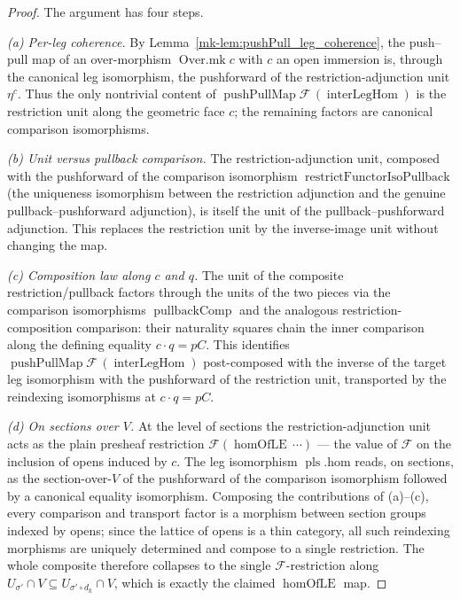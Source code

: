 \begin{proof}
  The argument has four steps.

  \emph{(a) Per-leg coherence.} By Lemma~\ref{mk-lem:pushPull_leg_coherence}, the push--pull map of an
  over-morphism \(\operatorname{Over.mk} c\) with \(c\) an open immersion is, through the canonical
  leg isomorphism, the pushforward of the restriction-adjunction unit \(\eta^c\). Thus the only
  nontrivial content of \(\operatorname{pushPullMap}\mathcal{F}\,(\operatorname{interLegHom})\) is the
  restriction unit along the geometric face \(c\); the remaining factors are canonical comparison
  isomorphisms.

  \emph{(b) Unit versus pullback comparison.} The restriction-adjunction unit, composed with the
  pushforward of the comparison isomorphism \(\operatorname{restrictFunctorIsoPullback}\) (the
  uniqueness isomorphism between the restriction adjunction and the genuine pullback--pushforward
  adjunction), is itself the unit of the pullback--pushforward adjunction. This replaces the
  restriction unit by the inverse-image unit without changing the map.

  \emph{(c) Composition law along \(c\) and \(q\).} The unit of the composite restriction/pullback
  factors through the units of the two pieces via the comparison isomorphisms
  \(\operatorname{pullbackComp}\) and the analogous restriction-composition comparison: their
  naturality squares chain the inner comparison along the defining equality \(c \cdot q = pC\). This
  identifies \(\operatorname{pushPullMap}\mathcal{F}\,(\operatorname{interLegHom})\) post-composed
  with the inverse of the target leg isomorphism with the pushforward of the restriction unit,
  transported by the reindexing isomorphisms at \(c \cdot q = pC\).

  \emph{(d) On sections over \(V\).} At the level of sections the restriction-adjunction unit acts
  as the plain presheaf restriction \(\mathcal{F}(\operatorname{homOfLE}\,\cdots)\) — the value of
  \(\mathcal{F}\) on the inclusion of opens induced by \(c\). The leg isomorphism
  \(\operatorname{pls}.\mathrm{hom}\) reads, on sections, as the section-over-\(V\) of the
  pushforward of the comparison isomorphism followed by a canonical equality isomorphism. Composing the
  contributions of (a)--(c), every comparison and transport factor is a morphism between section
  groups indexed by opens; since the lattice of opens is a thin category, all such reindexing
  morphisms are uniquely determined and compose to a single restriction. The whole composite
  therefore collapses to the single \(\mathcal{F}\)-restriction along
  \(U_{\sigma'} \cap V \subseteq U_{\sigma' \circ d_k} \cap V\), which is exactly the claimed
  \(\operatorname{homOfLE}\) map.
\end{proof}

